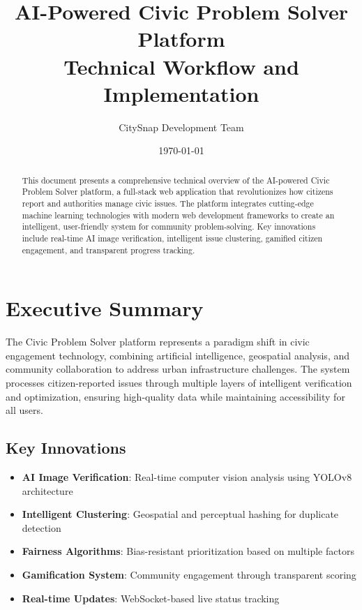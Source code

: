 \documentclass[12pt,a4paper]{article}
\title{\textbf{AI-Powered Civic Problem Solver Platform} \\ 
       \large Technical Workflow and Implementation}
\author{CitySnap Development Team}
\date{\today}
\begin{document}
\maketitle

\begin{abstract}
This document presents a comprehensive technical overview of the AI-powered Civic Problem Solver platform, a full-stack web application that revolutionizes how citizens report and authorities manage civic issues. The platform integrates cutting-edge machine learning technologies with modern web development frameworks to create an intelligent, user-friendly system for community problem-solving. Key innovations include real-time AI image verification, intelligent issue clustering, gamified citizen engagement, and transparent progress tracking.
\end{abstract}

\tableofcontents
\newpage

\section{Executive Summary}

The Civic Problem Solver platform represents a paradigm shift in civic engagement technology, combining artificial intelligence, geospatial analysis, and community collaboration to address urban infrastructure challenges. The system processes citizen-reported issues through multiple layers of intelligent verification and optimization, ensuring high-quality data while maintaining accessibility for all users.

\subsection{Key Innovations}
\begin{itemize}
    \item \textbf{AI Image Verification}: Real-time computer vision analysis using YOLOv8 architecture
    \item \textbf{Intelligent Clustering}: Geospatial and perceptual hashing for duplicate detection
    \item \textbf{Fairness Algorithms}: Bias-resistant prioritization based on multiple factors
    \item \textbf{Gamification System}: Community engagement through transparent scoring
    \item \textbf{Real-time Updates}: WebSocket-based live status tracking
\end{itemize}
\end{document}
